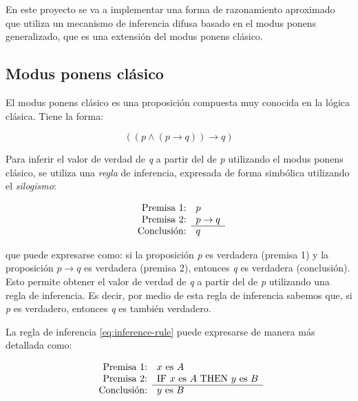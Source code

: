 En este proyecto se va a implementar una forma de razonamiento aproximado que utiliza un mecanismo de inferencia difusa basado en el modus ponens generalizado, que es una extensión del modus ponens clásico.

\subsection{Modus ponens clásico}
El modus ponens clásico es una proposición compuesta muy conocida en la lógica clásica. Tiene la forma:

\begin{equation}
((p \wedge (p \rightarrow q)) \rightarrow q)
\end{equation}

Para inferir el valor de verdad de \emph{q} a partir del de \emph{p} utilizando el modus ponens clásico, se utiliza una \emph{regla} de inferencia, expresada de forma simbólica utilizando el \emph{silogismo}:

\begin{equation}
\begin{array}{rl}
\text{Premisa 1:} & p \\
\text{Premisa 2:} & p \to q \\
\cline{2-2}
\text{Conclusión:} & q
\end{array}
\label{eq:inference-rule}
\end{equation}

que puede expresarse como: si la proposición \emph{p} es verdadera (premisa 1) y la proposición $p \to q$ es verdadera (premisa 2), entonces \emph{q} es verdadera (conclusión). Esto permite obtener el valor de verdad de \emph{q} a partir del de \emph{p} utilizando una regla de inferencia. Es decir, por medio de esta regla de inferencia sabemos que, si \emph{p} es verdadero, entonces \emph{q} es también verdadero.

La regla de inferencia \ref{eq:inference-rule} puede expresarse de manera más detallada como:

\begin{equation}
\begin{array}{rl}
\text{Premisa 1:} & x \text{ es } A \\
\text{Premisa 2:} & \text{IF } x \text{ es } A \text{ THEN } y \text{ es } B \\
\cline{2-2}
\text{Conclusión:} & y \text{ es } B
\end{array}
\label{eq:inference-rule-detail}
\end{equation}

